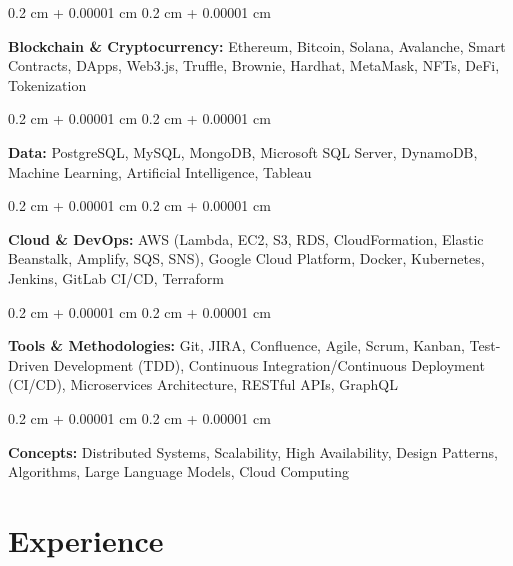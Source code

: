 \documentclass[10pt, letterpaper]{article}
\newenvironment{onecolentry}{
    \begin{adjustwidth}{
        0.2 cm + 0.00001 cm
    }{
        0.2 cm + 0.00001 cm
    }
}{
    \end{adjustwidth}
} %
\begin{document}
        \vspace{0.2 cm}

        \begin{onecolentry}
            \textbf{Blockchain \& Cryptocurrency:} Ethereum, Bitcoin, Solana, Avalanche, Smart Contracts, DApps, Web3.js, Truffle, Brownie, Hardhat, MetaMask, NFTs, DeFi, Tokenization
        \end{onecolentry}

        \vspace{0.2 cm}

        \begin{onecolentry}
            \textbf{Data:} PostgreSQL, MySQL, MongoDB, Microsoft SQL Server, DynamoDB, Machine Learning, Artificial Intelligence, Tableau
        \end{onecolentry}

        \vspace{0.2 cm}

        \begin{onecolentry}
            \textbf{Cloud \& DevOps:} AWS (Lambda, EC2, S3, RDS, CloudFormation, Elastic Beanstalk, Amplify, SQS, SNS), Google Cloud Platform, Docker, Kubernetes, Jenkins, GitLab CI/CD, Terraform
        \end{onecolentry}

        \vspace{0.2 cm}

        \begin{onecolentry}
            \textbf{Tools \& Methodologies:} Git, JIRA, Confluence, Agile, Scrum, Kanban, Test-Driven Development (TDD), Continuous Integration/Continuous Deployment (CI/CD), Microservices Architecture, RESTful APIs, GraphQL
        \end{onecolentry}

        \vspace{0.2 cm}

        \begin{onecolentry}
            \textbf{Concepts:} Distributed Systems, Scalability, High Availability, Design Patterns, Algorithms, Large Language Models, Cloud Computing
        \end{onecolentry}


    
    \section{Experience}
\end{document}
